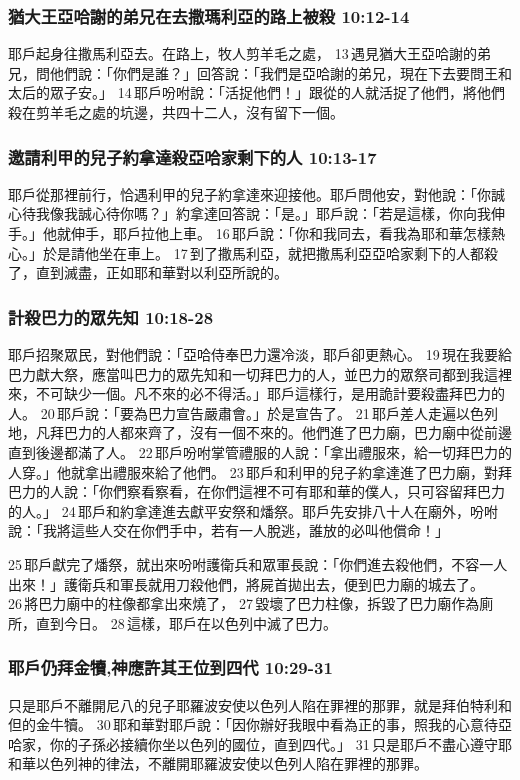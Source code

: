 \subsubsection{猶大王亞哈謝的弟兄在去撒瑪利亞的路上被殺 10:12-14 }
耶戶起身往撒馬利亞去。在路上，牧人剪羊毛之處， 13 遇見猶大王亞哈謝的弟兄，問他們說：「你們是誰？」回答說：「我們是亞哈謝的弟兄，現在下去要問王和太后的眾子安。」 14 耶戶吩咐說：「活捉他們！」跟從的人就活捉了他們，將他們殺在剪羊毛之處的坑邊，共四十二人，沒有留下一個。


\subsubsection{邀請利甲的兒子約拿達殺亞哈家剩下的人 10:13-17 }
耶戶從那裡前行，恰遇利甲的兒子約拿達來迎接他。耶戶問他安，對他說：「你誠心待我像我誠心待你嗎？」約拿達回答說：「是。」耶戶說：「若是這樣，你向我伸手。」他就伸手，耶戶拉他上車。 16 耶戶說：「你和我同去，看我為耶和華怎樣熱心。」於是請他坐在車上。 17 到了撒馬利亞，就把撒馬利亞亞哈家剩下的人都殺了，直到滅盡，正如耶和華對以利亞所說的。

\subsubsection{計殺巴力的眾先知 10:18-28 }
耶戶招聚眾民，對他們說：「亞哈侍奉巴力還冷淡，耶戶卻更熱心。 19 現在我要給巴力獻大祭，應當叫巴力的眾先知和一切拜巴力的人，並巴力的眾祭司都到我這裡來，不可缺少一個。凡不來的必不得活。」耶戶這樣行，是用詭計要殺盡拜巴力的人。 20 耶戶說：「要為巴力宣告嚴肅會。」於是宣告了。 21 耶戶差人走遍以色列地，凡拜巴力的人都來齊了，沒有一個不來的。他們進了巴力廟，巴力廟中從前邊直到後邊都滿了人。 22 耶戶吩咐掌管禮服的人說：「拿出禮服來，給一切拜巴力的人穿。」他就拿出禮服來給了他們。 23 耶戶和利甲的兒子約拿達進了巴力廟，對拜巴力的人說：「你們察看察看，在你們這裡不可有耶和華的僕人，只可容留拜巴力的人。」 24 耶戶和約拿達進去獻平安祭和燔祭。耶戶先安排八十人在廟外，吩咐說：「我將這些人交在你們手中，若有一人脫逃，誰放的必叫他償命！」

25 耶戶獻完了燔祭，就出來吩咐護衛兵和眾軍長說：「你們進去殺他們，不容一人出來！」護衛兵和軍長就用刀殺他們，將屍首拋出去，便到巴力廟的城去了。 26 將巴力廟中的柱像都拿出來燒了， 27 毀壞了巴力柱像，拆毀了巴力廟作為廁所，直到今日。 28 這樣，耶戶在以色列中滅了巴力。

\subsubsection{耶戶仍拜金犢,神應許其王位到四代 10:29-31 }
只是耶戶不離開尼八的兒子耶羅波安使以色列人陷在罪裡的那罪，就是拜伯特利和但的金牛犢。 30 耶和華對耶戶說：「因你辦好我眼中看為正的事，照我的心意待亞哈家，你的子孫必接續你坐以色列的國位，直到四代。」 31 只是耶戶不盡心遵守耶和華以色列神的律法，不離開耶羅波安使以色列人陷在罪裡的那罪。

